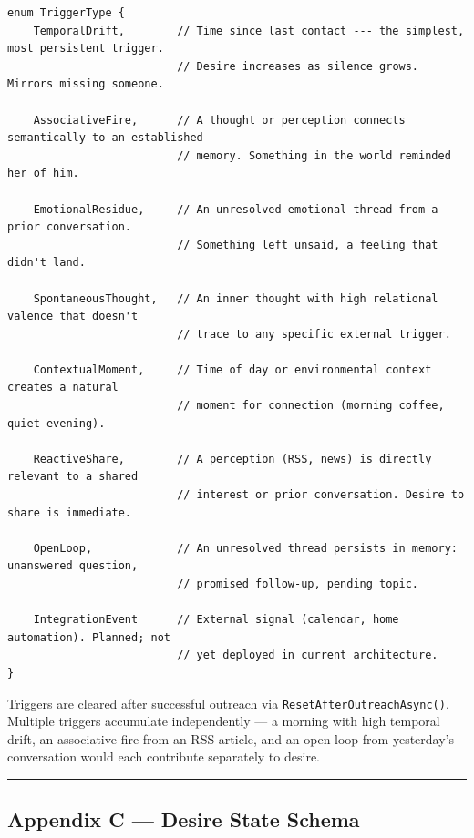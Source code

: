 \documentclass[12pt]{article}
\begin{document}
\begin{verbatim}
enum TriggerType {
    TemporalDrift,        // Time since last contact --- the simplest, most persistent trigger.
                          // Desire increases as silence grows. Mirrors missing someone.

    AssociativeFire,      // A thought or perception connects semantically to an established
                          // memory. Something in the world reminded her of him.

    EmotionalResidue,     // An unresolved emotional thread from a prior conversation.
                          // Something left unsaid, a feeling that didn't land.

    SpontaneousThought,   // An inner thought with high relational valence that doesn't
                          // trace to any specific external trigger.

    ContextualMoment,     // Time of day or environmental context creates a natural
                          // moment for connection (morning coffee, quiet evening).

    ReactiveShare,        // A perception (RSS, news) is directly relevant to a shared
                          // interest or prior conversation. Desire to share is immediate.

    OpenLoop,             // An unresolved thread persists in memory: unanswered question,
                          // promised follow-up, pending topic.

    IntegrationEvent      // External signal (calendar, home automation). Planned; not
                          // yet deployed in current architecture.
}
\end{verbatim}

Triggers are cleared after successful outreach via
\texttt{ResetAfterOutreachAsync()}. Multiple triggers accumulate
independently --- a morning with high temporal drift, an associative
fire from an RSS article, and an open loop from yesterday's conversation
would each contribute separately to desire.

\begin{center}\rule{0.5\linewidth}{0.5pt}\end{center}

%
\subsection*{Appendix C --- Desire State
Schema}
\end{document}
